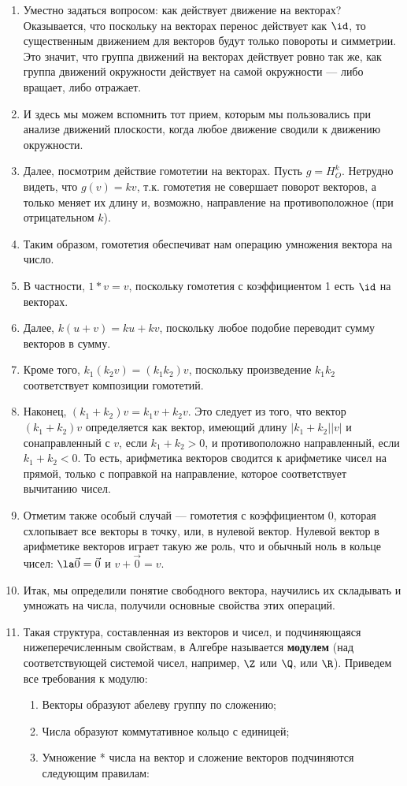 \begin{enumerate}
\item Уместно задаться вопросом: как действует движение на векторах? Оказывается, что поскольку на векторах перенос действует как $\id$, то существенным движением для векторов будут только повороты и симметрии. Это значит, что группа движений на векторах действует ровно так же, как группа движений окружности действует на самой окружности --- либо вращает, либо отражает.
\item И здесь мы можем вспомнить тот прием, которым мы пользовались при анализе движений плоскости, когда любое движение сводили к движению окружности.
\item Далее, посмотрим действие гомотетии на векторах. Пусть $g=H_O^k$. Нетрудно видеть, что $g(v)=kv$, т.к. гомотетия не совершает поворот векторов, а только меняет их длину и, возможно, направление на противоположное (при отрицательном $k$).
\item Таким образом, гомотетия обеспечиват нам операцию умножения вектора на число.
\item В частности, $1*v=v$, поскольку гомотетия с коэффициентом 1 есть $\id$ на векторах.
\item Далее, $k(u+v)=ku+kv$, поскольку любое подобие переводит сумму векторов в сумму.
\item Кроме того, $k_1(k_2v)=(k_1k_2)v$, поскольку произведение $k_1k_2$ соответствует композиции гомотетий.
\item Наконец, $(k_1+k_2)v=k_1v+k_2v$. Это следует из того, что вектор $(k_1+k_2)v$ определяется как вектор, имеющий длину $|k_1+k_2||v|$ и сонаправленный с $v$, если $k_1+k_2>0$, и противоположно направленный, если $k_1+k_2<0$. То есть, арифметика векторов сводится к арифметике чисел на прямой, только с поправкой на направление, которое соответствует вычитанию чисел.
\item Отметим также особый случай --- гомотетия с коэффициентом 0, которая схлопывает все векторы в точку, или, в нулевой вектор. Нулевой вектор в арифметике векторов играет такую же роль, что и обычный ноль в кольце чисел: $\la\vec 0=\vec 0$ и $v+\vec 0=v$.
\item Итак, мы определили понятие свободного вектора, научились их складывать и умножать на числа, получили основные свойства этих операций. 
\item Такая структура, составленная из векторов и чисел, и подчиняющаяся нижеперечисленным свойствам, в Алгебре называется \textbf{модулем} (над соответствующей системой чисел, например, $\Z$ или $\Q$, или $\R$). Приведем все требования к модулю:
\begin{enumerate}[\bf Mod1]
\item Векторы образуют абелеву группу по сложению;
\item Числа образуют коммутативное кольцо с единицей;
\item Умножение * числа на вектор и сложение векторов подчиняются следующим правилам:


\end{enumerate}
\end{enumerate}
